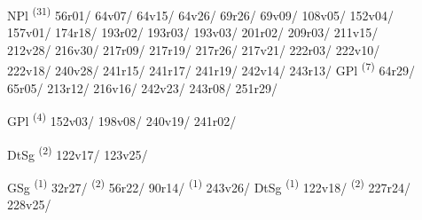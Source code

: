 \noindent{} \LEMMALINE
\begin{description}
    \item[] NPl \textsuperscript{(31)} \mbox{56r01/} \mbox{64v07/} \mbox{64v15/} \mbox{64v26/} \mbox{69r26/} \mbox{69v09/} \mbox{108v05/} \mbox{152v04/} \mbox{157v01/} \mbox{174r18/} \mbox{193r02/} \mbox{193r03/} \mbox{193v03/} \mbox{201r02/} \mbox{209r03/} \mbox{211v15/} \mbox{212v28/} \mbox{216v30/} \mbox{217r09/} \mbox{217r19/} \mbox{217r26/} \mbox{217v21/} \mbox{222r03/} \mbox{222v10/} \mbox{222v18/} \mbox{240v28/} \mbox{241r15/} \mbox{241r17/} \mbox{241r19/} \mbox{242v14/} \mbox{243r13/} \CASEBREAK GPl \textsuperscript{(7)} \mbox{64r29/} \mbox{65r05/} \mbox{213r12/} \mbox{216v16/} \mbox{242v23/} \mbox{243r08/} \mbox{251r29/}
\end{description}
\ENTRYEND

\noindent{} \LEMMALINE
\begin{description}
    \item[] GPl \textsuperscript{(4)} \mbox{152v03/} \mbox{198v08/} \mbox{240v19/} \mbox{241r02/}
\end{description}
\ENTRYEND

\noindent{} \LEMMALINE
\begin{description}
    \item[] DtSg \textsuperscript{(2)} \mbox{122v17/} \mbox{123v25/}
\end{description}
\ENTRYEND

\noindent{} \LEMMALINE
\begin{description}
    \item[] GSg \textsuperscript{(1)} \mbox{32r27/} \textsuperscript{(2)} \mbox{56r22/} \mbox{90r14/} \textsuperscript{(1)} \mbox{243v26/} \CASEBREAK DtSg \textsuperscript{(1)} \mbox{122v18/} \textsuperscript{(2)} \mbox{227r24/} \mbox{228v25/}
\end{description}
\ENTRYEND


